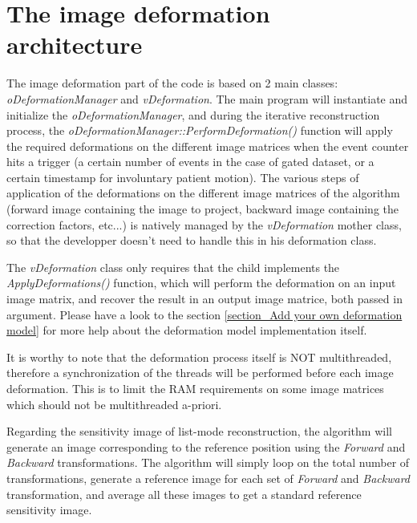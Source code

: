 \documentclass[a4paper, 11pt]{article}
\begin{document}
\section{The image deformation architecture}
\label{s_architecture}

The image deformation part of the code is based on 2 main classes: \textit{oDeformationManager} and \textit{vDeformation}. The main program will instantiate and initialize the \textit{oDeformationManager}, and during the iterative reconstruction process, the \textit{oDeformationManager::PerformDeformation()} function will apply the required deformations on the different image matrices when the event counter hits a trigger (a certain number of events in the case of gated dataset, or a certain timestamp for involuntary patient motion). The various steps of application of the deformations on the different image matrices of the algorithm (forward image containing the image to project, backward image containing the correction factors, etc...) is natively managed by the \textit{vDeformation} mother class, so that the developper doesn't need to handle this in his deformation class. 

The \textit{vDeformation} class only requires that the child implements the \textit{ApplyDeformations()} function, which will perform the deformation on an input image matrix, and recover the result in an output image matrice, both passed in argument. Please have a look to the section \ref{section_Add your own deformation model} for more help about the deformation model implementation itself.

It is worthy to note that the deformation process itself is NOT multithreaded, therefore a synchronization of the threads will be performed before each image deformation. This is to limit the RAM requirements on some image matrices which should not be multithreaded a-priori. 

Regarding the sensitivity image of list-mode reconstruction, the algorithm will generate an image corresponding to the reference position using the \textit{Forward} and \textit{Backward} transformations. The algorithm will simply loop on the total number of transformations, generate a reference image for each set of \textit{Forward} and \textit{Backward} transformation, and average all these images to get a standard reference sensitivity image.


\clearpage
\end{document}
